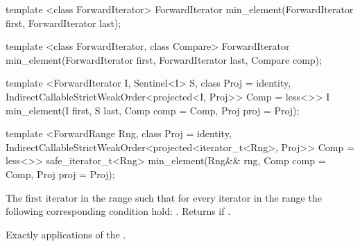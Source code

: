 %
\begin{removedblock}
\begin{itemdecl}
template <class ForwardIterator>
  ForwardIterator min_element(ForwardIterator first, ForwardIterator last);

template <class ForwardIterator, class Compare>
  ForwardIterator min_element(ForwardIterator first, ForwardIterator last,
                            Compare comp);
\end{itemdecl}
\end{removedblock}
\begin{addedblock}
\begin{itemdecl}
template <ForwardIterator I, Sentinel<I> S, class Proj = identity,
    IndirectCallableStrictWeakOrder<projected<I, Proj>> Comp = less<>>
  I min_element(I first, S last, Comp comp = Comp{}, Proj proj = Proj{});

template <ForwardRange Rng, class Proj = identity,
    IndirectCallableStrictWeakOrder<projected<iterator_t<Rng>, Proj>> Comp = less<>>
  safe_iterator_t<Rng>
    min_element(Rng&& rng, Comp comp = Comp{}, Proj proj = Proj{});
\end{itemdecl}
\end{addedblock}

\begin{itemdescr}
\pnum
\returns
The first iterator
in the range
such that for every iterator
in the range
the following corresponding condition hold:
.
Returns
if
.

\pnum
\complexity
Exactly
applications of the .
\end{itemdescr}


